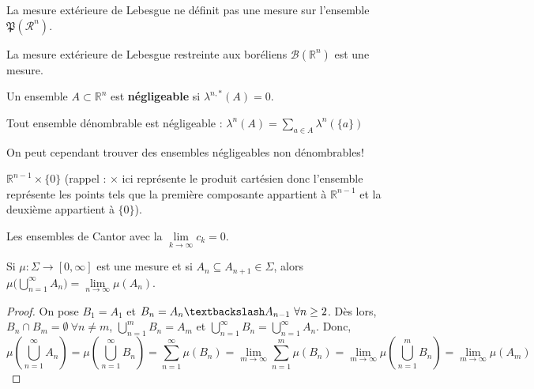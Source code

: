 \begin{theo}
    La mesure extérieure de Lebesgue ne définit pas une mesure sur l'ensemble $\mathfrak{P}(\mathcal{R}^n)$.
\end{theo}

\begin{theo}
    La mesure extérieure de Lebesgue restreinte aux boréliens $\mathscr{B}(\mathbb{R}^n)$ est une mesure.
\end{theo}

\begin{definition}
    Un ensemble $A\subset\mathbb{R}^n$ est \textbf{négligeable} si $\lambda^{n,*}(A)=0$.
\end{definition}

\begin{theo}
    Tout ensemble dénombrable est négligeable :  $\lambda^n(A)=\sum_{a\in A}\lambda^n(\{a\})$
\end{theo}

On peut cependant trouver des ensembles négligeables non dénombrables!
\begin{example}
    $\mathbb{R}^{n-1}\times\{0\}$ (rappel : $\times$ ici représente le produit cartésien donc l'ensemble représente les points tels que la première composante appartient à $\mathbb{R}^{n-1}$ et la deuxième appartient à $\{0\}$).
\end{example}
\begin{example}
    Les ensembles de Cantor avec la $\lim\limits_{k\to\infty}c_k=0$.
\end{example}

\begin{theo}
    Si $\mu:\Sigma\to[0,\infty]$ est une mesure et si $A_n\subseteq A_{n+1}\in\Sigma$, alors $\mu\bigg(\bigcup\limits_{n=1}^\infty A_n\bigg)=\lim\limits_{n\to\infty}\mu(A_n)$.
\end{theo}
\begin{proof}
    On pose $B_1=A_1$ et $B_n = A_n\textbackslash A_{n-1}\ \forall n\geq 2$. Dès lors, $B_n\cap B_m=\emptyset \ \forall n\neq m$, $\bigcup_{n=1}^mB_n=A_m$ et $\bigcup_{n=1}^\infty B_n=\bigcup_{n=1}^\infty A_n$. Donc,
    \begin{equation*}
        \mu\left(\bigcup_{n=1}^\infty A_n\right) = \mu\left(\bigcup_{n=1}^\infty B_n\right) = \sum_{n=1}^\infty\mu(B_n) = \lim_{m\to\infty}\sum_{n=1}^m\mu(B_n) = \lim_{m\to\infty}\mu\left(\bigcup_{n=1}^m B_n\right) = \lim_{m\to\infty}\mu(A_m)
    \end{equation*}
\end{proof}

